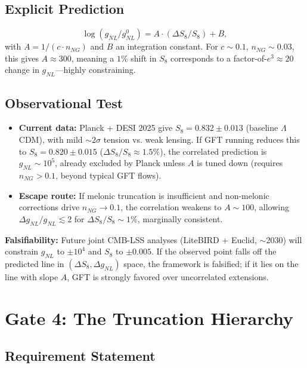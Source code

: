 \documentclass[12pt,a4paper]{article}
\begin{document}
\subsection{Explicit Prediction}

\begin{equation}
\log(g_{NL}/g_{NL}^0) = A \cdot (\Delta S_8/S_8) + B,
\end{equation}
with \(A = 1/(c \cdot n_{NG})\) and \(B\) an integration constant. For \(c \sim 0.1\), \(n_{NG} \sim 0.03\), this gives \(A \approx 300\), meaning a \(1\%\) shift in \(S_8\) corresponds to a factor-of-\(e^3 \approx 20\) change in \(g_{NL}\)—highly constraining.

\subsection{Observational Test}

\begin{itemize}
\item \textbf{Current data:} Planck + DESI 2025 give \(S_8 = 0.832 \pm 0.013\) (baseline \(\Lambda\)CDM), with mild \(\sim 2\sigma\) tension vs. weak lensing. If GFT running reduces this to \(S_8 = 0.820 \pm 0.015\) (\(\Delta S_8/S_8 \approx 1.5\%\)), the correlated prediction is \(g_{NL} \sim 10^5\), already excluded by Planck unless \(A\) is tuned down (requires \(n_{NG} > 0.1\), beyond typical GFT flows).

\item \textbf{Escape route:} If melonic truncation is insufficient and non-melonic corrections drive \(n_{NG} \to 0.1\), the correlation weakens to \(A \sim 100\), allowing \(\Delta g_{NL}/g_{NL} \lesssim 2\) for \(\Delta S_8/S_8 \sim 1\%\), marginally consistent.
\end{itemize}

\textbf{Falsifiability:} Future joint CMB-LSS analyses (LiteBIRD + Euclid, \(\sim\)2030) will constrain \(g_{NL}\) to \(\pm 10^4\) and \(S_8\) to \(\pm 0.005\). If the observed point falls off the predicted line in \((\Delta S_8, \Delta g_{NL})\) space, the framework is falsified; if it lies on the line with slope \(A\), GFT is strongly favored over uncorrelated extensions.

\section{Gate 4: The Truncation Hierarchy}

\subsection{Requirement Statement}
\end{document}
